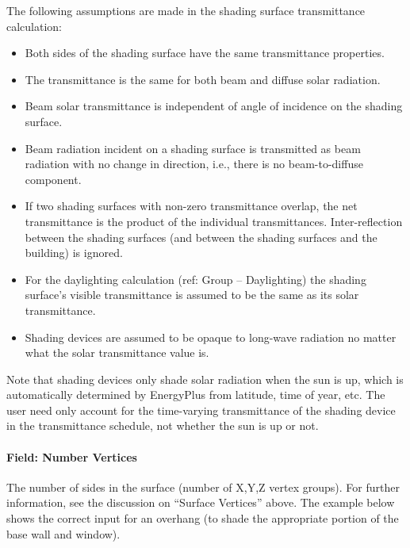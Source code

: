 The following assumptions are made in the shading surface transmittance calculation:

\begin{itemize}
\item
  Both sides of the shading surface have the same transmittance properties.
\item
  The transmittance is the same for both beam and diffuse solar radiation.
\item
  Beam solar transmittance is independent of angle of incidence on the shading surface.
\item
  Beam radiation incident on a shading surface is transmitted as beam radiation with no change in direction, i.e., there is no beam-to-diffuse component.
\item
  If two shading surfaces with non-zero transmittance overlap, the net transmittance is the product of the individual transmittances. Inter-reflection between the shading surfaces (and between the shading surfaces and the building) is ignored.
\item
  For the daylighting calculation (ref: Group -- Daylighting) the shading surface's visible transmittance is assumed to be the same as its solar transmittance.
\item
  Shading devices are assumed to be opaque to long-wave radiation no matter what the solar transmittance value is.
\end{itemize}

Note that shading devices only shade solar radiation when the sun is up, which is automatically determined by EnergyPlus from latitude, time of year, etc. The user need only account for the time-varying transmittance of the shading device in the transmittance schedule, not whether the sun is up or not.

\paragraph{Field: Number Vertices}\label{field-number-vertices-1}

The number of sides in the surface (number of X,Y,Z vertex groups). For further information, see the discussion on ``Surface Vertices'' above. The example below shows the correct input for an overhang (to shade the appropriate portion of the base wall and window).

